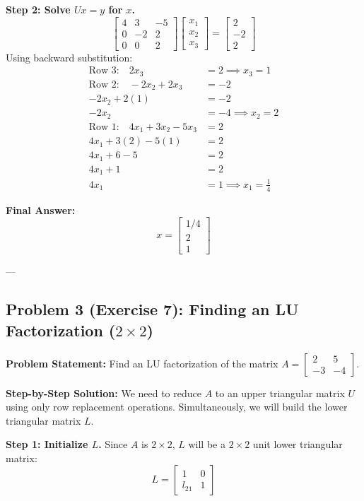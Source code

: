 \documentclass[11pt]{article}
\begin{document}
\textbf{Step 2: Solve $Ux = y$ for $x$.}
\[ \begin{bmatrix} 4 & 3 & -5 \\ 0 & -2 & 2 \\ 0 & 0 & 2 \end{bmatrix} \begin{bmatrix} x_1 \\ x_2 \\ x_3 \end{bmatrix} = \begin{bmatrix} 2 \\ -2 \\ 2 \end{bmatrix} \]
Using backward substitution:
\begin{align*}
    \text{Row 3:} \quad 2x_3 &= 2 \implies x_3 = 1 \\
    \text{Row 2:} \quad -2x_2 + 2x_3 &= -2 \\
    -2x_2 + 2(1) &= -2 \\
    -2x_2 &= -4 \implies x_2 = 2 \\
    \text{Row 1:} \quad 4x_1 + 3x_2 - 5x_3 &= 2 \\
    4x_1 + 3(2) - 5(1) &= 2 \\
    4x_1 + 6 - 5 &= 2 \\
    4x_1 + 1 &= 2 \\
    4x_1 &= 1 \implies x_1 = \frac{1}{4}
\end{align*}

\textbf{Final Answer:}
\[ x = \begin{bmatrix} 1/4 \\ 2 \\ 1 \end{bmatrix} \]

---

\subsection{Problem 3 (Exercise 7): Finding an LU Factorization ($2 \times 2$)}
\textbf{Problem Statement:} Find an LU factorization of the matrix $A = \begin{bmatrix} 2 & 5 \\ -3 & -4 \end{bmatrix}$.

\textbf{Step-by-Step Solution:}
We need to reduce $A$ to an upper triangular matrix $U$ using only row replacement operations. Simultaneously, we will build the lower triangular matrix $L$.

\textbf{Step 1: Initialize $L$.}
Since $A$ is $2 \times 2$, $L$ will be a $2 \times 2$ unit lower triangular matrix:
\[ L = \begin{bmatrix} 1 & 0 \\ l_{21} & 1 \end{bmatrix} \]
\end{document}
